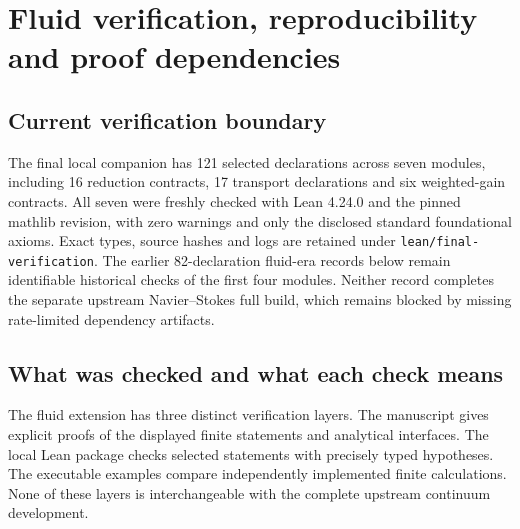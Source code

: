 \chapter{Fluid verification, reproducibility and proof dependencies}

\section{Current verification boundary}

The final local companion has 121 selected declarations across seven modules,
including 16 reduction contracts, 17 transport declarations and six weighted-gain contracts. All seven were
freshly checked with Lean 4.24.0 and the pinned mathlib revision, with zero
warnings and only the disclosed standard foundational axioms. Exact types,
source hashes and logs are retained under \texttt{lean/final-verification}.
The earlier 82-declaration fluid-era records below remain identifiable
historical checks of the first four modules. Neither record completes the
separate upstream Navier--Stokes full build, which remains blocked by missing
rate-limited dependency artifacts.

\label{ch:fluid-verification}

\section{What was checked and what each check means}

The fluid extension has three distinct verification layers. The manuscript gives explicit proofs of the displayed finite statements and analytical interfaces. The local Lean package checks selected statements with precisely typed hypotheses. The executable examples compare independently implemented finite calculations. None of these layers is interchangeable with the complete upstream continuum development.

